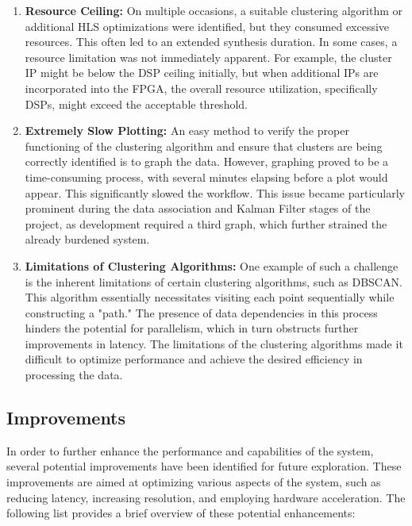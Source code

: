 \documentclass[journal]{IEEEtran} %
\begin{document}
\begin{enumerate}
\item \textbf{Resource Ceiling:}
On multiple occasions, a suitable clustering algorithm or additional HLS optimizations were identified, but they consumed excessive resources. This often led to an extended synthesis duration. In some cases, a resource limitation was not immediately apparent. For example, the cluster IP might be below the DSP ceiling initially, but when additional IPs are incorporated into the FPGA, the overall resource utilization, specifically DSPs, might exceed the acceptable threshold.

\item \textbf{Extremely Slow Plotting:}
An easy method to verify the proper functioning of the clustering algorithm and ensure that clusters are being correctly identified is to graph the data. However, graphing proved to be a time-consuming process, with several minutes elapsing before a plot would appear. This significantly slowed the workflow. This issue became particularly prominent during the data association and Kalman Filter stages of the project, as development required a third graph, which further strained the already burdened system.

\item \textbf{Limitations of Clustering Algorithms:}
One example of such a challenge is the inherent limitations of certain clustering algorithms, such as DBSCAN. This algorithm essentially necessitates visiting each point sequentially while constructing a "path." The presence of data dependencies in this process hinders the potential for parallelism, which in turn obstructs further improvements in latency. The limitations of the clustering algorithms made it difficult to optimize performance and achieve the desired efficiency in processing the data.

\end{enumerate}

\subsection{Improvements}

In order to further enhance the performance and capabilities of the system, several potential improvements have been identified for future exploration. These improvements are aimed at optimizing various aspects of the system, such as reducing latency, increasing resolution, and employing hardware acceleration. The following list provides a brief overview of these potential enhancements:
\end{document}
